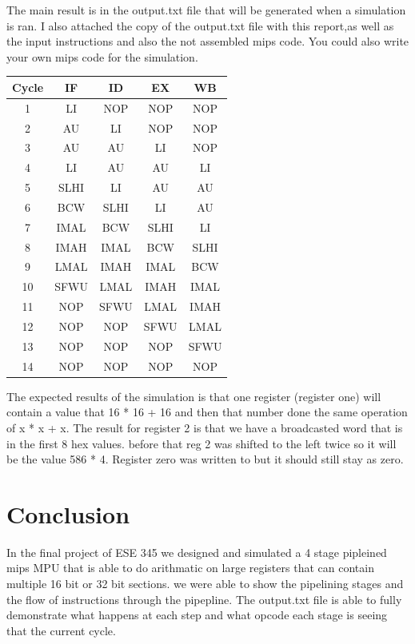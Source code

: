 \documentclass{article}
\begin{document}
The main result is in the output.txt file that will be generated when a simulation is ran. I also attached the copy of the output.txt file with this report,as well as the input instructions and also the not assembled mips code. You could also write your own mips code for the simulation.

\begin{center}
	\begin{tabular} {|c||c|c|c|c|}
		\hline
		Cycle & IF & ID & EX & WB \\
		\hline
		\hline
		1 & LI & NOP & NOP & NOP \\
		\hline
		2 & AU & LI & NOP & NOP \\
		\hline
		3 & AU & AU & LI & NOP \\
		\hline
		4 & LI & AU & AU & LI \\
		\hline
		5 & SLHI & LI & AU & AU \\
		\hline
		6 & BCW & SLHI & LI & AU \\
		\hline
		7 & IMAL & BCW & SLHI & LI \\
		\hline
		8 & IMAH & IMAL & BCW & SLHI \\
		\hline
		9 & LMAL & IMAH & IMAL & BCW \\
		\hline
		10 & SFWU & LMAL & IMAH & IMAL \\
		\hline
		11 & NOP & SFWU & LMAL & IMAH \\
		\hline
		12 & NOP & NOP & SFWU & LMAL \\
		\hline
		13 & NOP & NOP & NOP & SFWU \\
		\hline
		14 & NOP & NOP & NOP & NOP \\
		\hline
	\end{tabular}
\end{center}

The expected results of the simulation is that one register (register one) will contain a value that 16 * 16 + 16 and then that number done the same operation of x * x + x. The result for register 2 is that we have a broadcasted word that is in the first 8 hex values. before that reg 2 was shifted to the left twice so it will be the value 586 * 4. Register zero was written to but it should still stay as zero.

\section{Conclusion}

In the final project of ESE 345 we designed and simulated a 4 stage pipleined mips MPU that is able to do arithmatic on large registers that can contain multiple 16 bit or 32 bit sections.  we were able to show the pipelining stages and the flow of instructions through the pipepline. The output.txt file is able to fully demonstrate what happens at each step and what opcode each stage is seeing that the current cycle.
\end{document}
